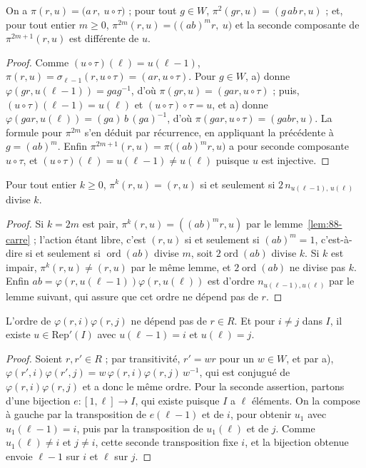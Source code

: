 \begin{lemme}\label{lem:88-carre}
On a $\pi(r, u) = \bigl(a\, r,\ u \circ \tau\bigr)$ ; pour tout $g \in W$, $\pi^2(g r, u) = (g\,ab\,r, u)$ ; et, pour tout entier $m \geq 0$, $\pi^{2m}(r, u) = \bigl((ab)^m r,\ u\bigr)$ et la seconde composante de $\pi^{2m+1}(r, u)$ est différente de $u$.
\end{lemme}

\begin{proof}
Comme $(u \circ \tau)(\ell) = u(\ell - 1)$, $\pi(r, u) = \sigma_{\ell-1}(r, u \circ \tau) = (a r, u \circ \tau)$. Pour $g \in W$, a) donne $\varphi(gr, u(\ell-1)) = g a g^{-1}$, d'où $\pi(gr, u) = (g a r, u \circ \tau)$ ; puis, $(u \circ \tau)(\ell - 1) = u(\ell)$ et $(u \circ \tau) \circ \tau = u$, et a) donne $\varphi(gar, u(\ell)) = (ga)\,b\,(ga)^{-1}$, d'où $\pi(gar, u \circ \tau) = (g a b r, u)$. La formule pour $\pi^{2m}$ s'en déduit par récurrence, en appliquant la précédente à $g = (ab)^m$. Enfin $\pi^{2m+1}(r, u) = \pi\bigl((ab)^m r, u\bigr)$ a pour seconde composante $u \circ \tau$, et $(u \circ \tau)(\ell) = u(\ell - 1) \neq u(\ell)$ puisque $u$ est injective.
\end{proof}

\begin{lemme}\label{lem:88-fixe}
Pour tout entier $k \geq 0$, $\pi^k(r, u) = (r, u)$ si et seulement si $2\, n_{u(\ell-1),\, u(\ell)}$ divise $k$.
\end{lemme}

\begin{proof}
Si $k = 2m$ est pair, $\pi^k(r, u) = ((ab)^m r, u)$ par le lemme~\ref{lem:88-carre} ; l'action étant libre, c'est $(r, u)$ si et seulement si $(ab)^m = 1$, c'est-à-dire si et seulement si $\operatorname{ord}(ab)$ divise $m$, soit $2\operatorname{ord}(ab)$ divise $k$. Si $k$ est impair, $\pi^k(r, u) \neq (r, u)$ par le même lemme, et $2\operatorname{ord}(ab)$ ne divise pas $k$. Enfin $ab = \varphi(r, u(\ell-1))\varphi(r, u(\ell))$ est d'ordre $n_{u(\ell-1), u(\ell)}$ par le lemme suivant, qui assure que cet ordre ne dépend pas de $r$.
\end{proof}

\begin{lemme}\label{lem:88-indep}
L'ordre de $\varphi(r, i)\varphi(r, j)$ ne dépend pas de $r \in R$. Et pour $i \neq j$ dans $I$, il existe $u \in \mathrm{Rep}'(I)$ avec $u(\ell - 1) = i$ et $u(\ell) = j$.
\end{lemme}

\begin{proof}
Soient $r, r' \in R$ ; par transitivité, $r' = wr$ pour un $w \in W$, et par a), $\varphi(r', i)\varphi(r', j) = w\,\varphi(r, i)\varphi(r, j)\,w^{-1}$, qui est conjugué de $\varphi(r, i)\varphi(r, j)$ et a donc le même ordre. Pour la seconde assertion, partons d'une bijection $e : [1, \ell] \to I$, qui existe puisque $I$ a $\ell$ éléments. On la compose à gauche par la transposition de $e(\ell - 1)$ et de $i$, pour obtenir $u_1$ avec $u_1(\ell - 1) = i$, puis par la transposition de $u_1(\ell)$ et de $j$. Comme $u_1(\ell) \neq i$ et $j \neq i$, cette seconde transposition fixe $i$, et la bijection obtenue envoie $\ell - 1$ sur $i$ et $\ell$ sur $j$.
\end{proof}

